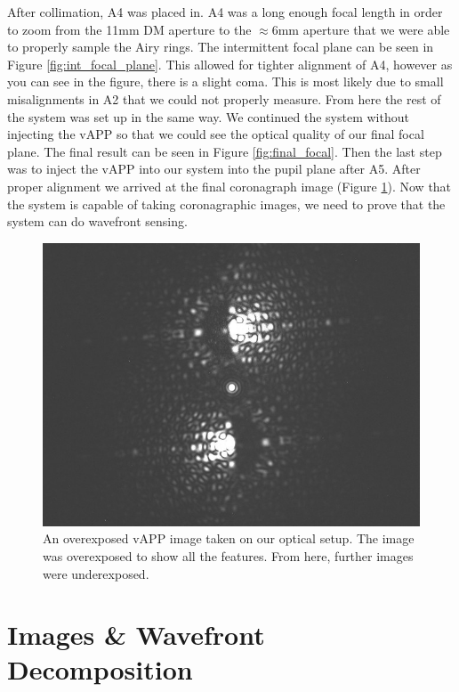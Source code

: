After collimation, A4 was placed in.  A4 was a long enough focal length in order to zoom from the 11mm DM aperture to the $\approx 6$mm aperture that we were able to properly sample the Airy rings.  The intermittent focal plane can be seen in Figure \ref{fig:int_focal_plane}.  This allowed for tighter alignment of A4, however as you can see in the figure, there is a slight coma.  This is most likely due to small misalignments in A2 that we could not properly measure.  From here the rest of the system was set up in the same way.  We continued the system without injecting the vAPP so that we could see the optical quality of our final focal plane.  The final result can be seen in Figure \ref{fig:final_focal}.  Then the last step was to inject the vAPP into our system into the pupil plane after A5.  After proper alignment we arrived at the final coronagraph image (Figure \ref{fig:GMT_vapp}). Now that the system is capable of taking coronagraphic images, we need to prove that the system can do wavefront sensing.

\begin{figure}[H]
    \centering
    \includegraphics[width = 14cm]{Figures/GMT_gvAPP_04_03_2020.jpg}
    \caption{An overexposed vAPP image taken on our optical setup.  The image was overexposed to show all the features.  From here, further images were underexposed.}
    \label{fig:GMT_vapp}
\end{figure}




\section{Images \& Wavefront Decomposition}

